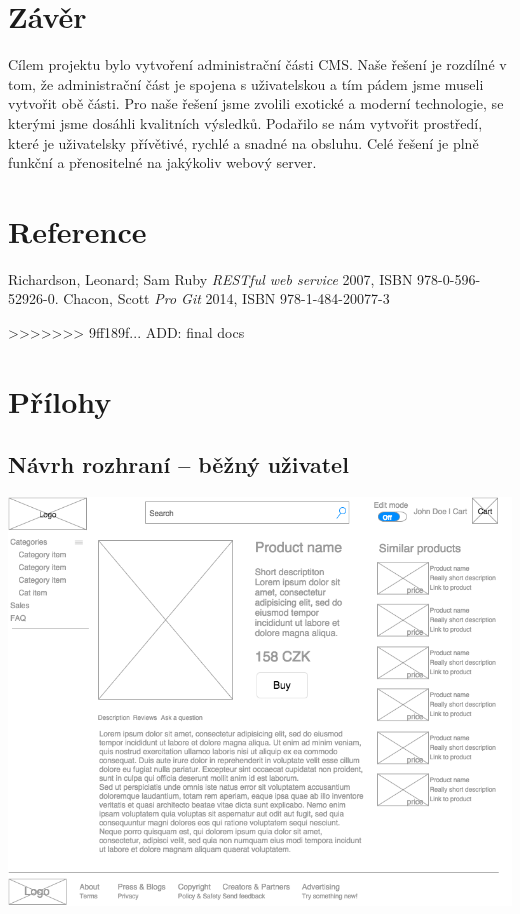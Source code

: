 \documentclass[11pt,a4paper]{article}
\begin{document}
\section*{Závěr}
Cílem projektu bylo vytvoření administrační části CMS. Naše řešení je rozdílné v tom, že administrační část je spojena s uživatelskou a tím pádem jsme museli vytvořit obě části. Pro naše řešení jsme zvolili exotické a moderní technologie, se kterými jsme dosáhli kvalitních výsledků. Podařilo se nám vytvořit prostředí, které je uživatelsky přívětivé, rychlé a snadné na obsluhu. Celé řešení je plně funkční a přenositelné na jakýkoliv webový server.

\section*{Reference} %
\begin{thebibliography}{1}

   Richardson, Leonard; Sam Ruby {\em  RESTful web service} 2007, ISBN 978-0-596-52926-0.
   Chacon, Scott {\em Pro Git} 2014, ISBN 978-1-484-20077-3

\end{thebibliography}
>>>>>>> 9ff189f... ADD: final docs

\section*{Přílohy}

\subsection*{Návrh rozhraní -- běžný uživatel}
\includegraphics[scale=0.6]{pyngshop.png}
\end{document}
